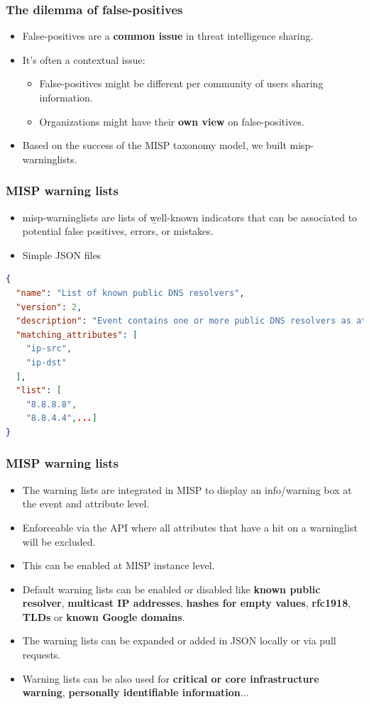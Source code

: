 \begin{frame}
        \frametitle{The dilemma of false-positives}
        \begin{itemize}
            \item False-positives are a {\bf common issue} in threat intelligence sharing.
                \item It's often a contextual issue:
                \begin{itemize}
                \item False-positives might be different per community of users sharing information.
                \item Organizations might have their {\bf own view} on false-positives.
                \end{itemize}
        \item Based on the success of the MISP taxonomy model, we built misp-warninglists.
        \end{itemize}
\end{frame}

\begin{frame}[t,fragile]
        \frametitle{MISP warning lists}
        \begin{itemize}
            \item misp-warninglists are lists of {\b well-known indicators} that can be associated to potential false positives, errors, or mistakes.
                \item Simple JSON files
        \end{itemize}
\begin{lstlisting}[language=json,firstnumber=1]
{
  "name": "List of known public DNS resolvers",
  "version": 2,
  "description": "Event contains one or more public DNS resolvers as attribute with an IDS flag set",
  "matching_attributes": [
    "ip-src",
    "ip-dst"
  ],
  "list": [
    "8.8.8.8",
    "8.8.4.4",...]
}
\end{lstlisting}
\end{frame}

\begin{frame}[t,fragile]
\frametitle{MISP warning lists}
\begin{itemize}
\item The warning lists are integrated in MISP to display an info/warning box at the event and attribute level.
\item Enforceable via the API where all attributes that have a hit on a warninglist will be excluded.
\item This can be enabled at MISP instance level.
\item Default warning lists can be enabled or disabled like {\bf known public resolver}, {\bf multicast IP addresses}, {\bf hashes for empty values}, {\bf rfc1918}, {\bf TLDs} or {\bf known Google domains}.
\item The warning lists can be expanded or added in JSON locally or via pull requests.
\item Warning lists can be also used for {\bf critical or core infrastructure warning}, {\bf personally identifiable information}...
\end{itemize}
\end{frame}


